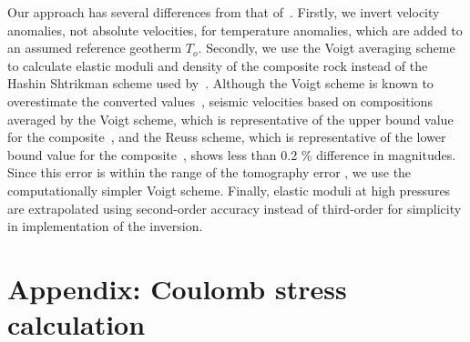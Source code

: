 \documentclass[draft,linenumbers]{agujournal2018}
\begin{document}
Our approach has several differences from that of~\citet{Cammarano2003}. Firstly, we invert velocity anomalies, not absolute velocities, for temperature anomalies, which are added to an assumed reference geotherm $T_o$. Secondly, we use the Voigt averaging scheme to calculate elastic moduli and density of the composite rock instead of the Hashin Shtrikman scheme used by~\citet{Cammarano2003}. Although the Voigt scheme is known to overestimate the converted values~\citep{watt_1976}, seismic velocities based on compositions averaged by the Voigt scheme, which is representative of the upper bound value for the composite~\citep{watt_1976}, and the Reuss scheme, which is representative of the  lower bound value for the composite~\citep{watt_1976}, shows less than 0.2 \% difference in magnitudes. Since this error is within the range of the tomography error \citep{Biryol_2016}, we use the computationally simpler Voigt scheme. Finally, elastic moduli at high pressures are extrapolated using second-order accuracy instead of third-order for simplicity in implementation of the inversion.

\section{Appendix: Coulomb stress calculation}
\end{document}
